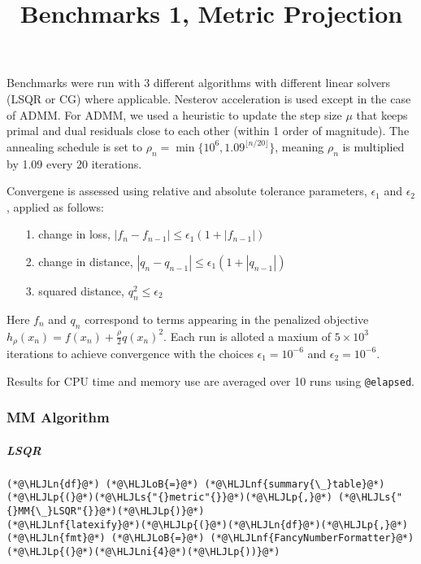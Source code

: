 \documentclass[12pt,a4paper]{article}
\title{ Benchmarks 1, Metric Projection }
\newcommand{\HLJLn}[1]{#1}
\newcommand{\HLJLnf}[1]{\textcolor[RGB]{66,102,213}{#1}}
\newcommand{\HLJLs}[1]{\textcolor[RGB]{201,61,57}{#1}}
\newcommand{\HLJLni}[1]{\textcolor[RGB]{59,151,46}{#1}}
\newcommand{\HLJLoB}[1]{\textcolor[RGB]{102,102,102}{\textbf{#1}}}
\newcommand{\HLJLp}[1]{#1}
\begin{document}
\maketitle


Benchmarks were run with 3 different algorithms with different linear solvers (LSQR or CG) where applicable. Nesterov acceleration is used except in the case of ADMM. For ADMM, we used a heuristic to update the step size $\mu$ that keeps primal and dual residuals close to each other (within 1 order of magnitude). The annealing schedule is set to $\rho_{n} = \min\{10^{6}, 1.09^{\lfloor n / 20\rfloor}\}$, meaning $\rho_{n}$ is multiplied by 1.09 every 20 iterations.

Convergene is assessed using relative and absolute tolerance parameters, $\epsilon_{1}$ and $\epsilon_{2}$, applied as follows:

\begin{itemize}
\item[1. ] change in loss, $|f_{n} - f_{n-1}| \le \epsilon_{1} (1 + |f_{n-1}|)$


\item[2. ] change in distance, $|q_{n} - q_{n-1}| \le \epsilon_{1} (1 + |q_{n-1}|)$


\item[3. ] squared distance, $q_{n}^{2} \le \epsilon_{2}$

\end{itemize}
Here $f_{n}$ and $q_{n}$ correspond to terms appearing in the penalized objective $h_{\rho}(x_{n}) = f(x_{n}) + \frac{\rho}{2} q(x_{n})^{2}$. Each run is alloted a maxium of $5 \times 10^{3}$ iterations to achieve convergence with the choices $\epsilon_{1} = 10^{-6}$ and $\epsilon_{2} = 10^{-6}$.

Results for CPU time and memory use are averaged over 10 runs using \texttt{@elapsed}.

\subsubsection{MM Algorithm}
\subparagraph{LSQR}

\begin{lstlisting}
(*@\HLJLn{df}@*) (*@\HLJLoB{=}@*) (*@\HLJLnf{summary{\_}table}@*)(*@\HLJLp{(}@*)(*@\HLJLs{"{}metric"{}}@*)(*@\HLJLp{,}@*) (*@\HLJLs{"{}MM{\_}LSQR"{}}@*)(*@\HLJLp{)}@*)
(*@\HLJLnf{latexify}@*)(*@\HLJLp{(}@*)(*@\HLJLn{df}@*)(*@\HLJLp{,}@*) (*@\HLJLn{fmt}@*) (*@\HLJLoB{=}@*) (*@\HLJLnf{FancyNumberFormatter}@*)(*@\HLJLp{(}@*)(*@\HLJLni{4}@*)(*@\HLJLp{))}@*)
\end{lstlisting}
\end{document}
